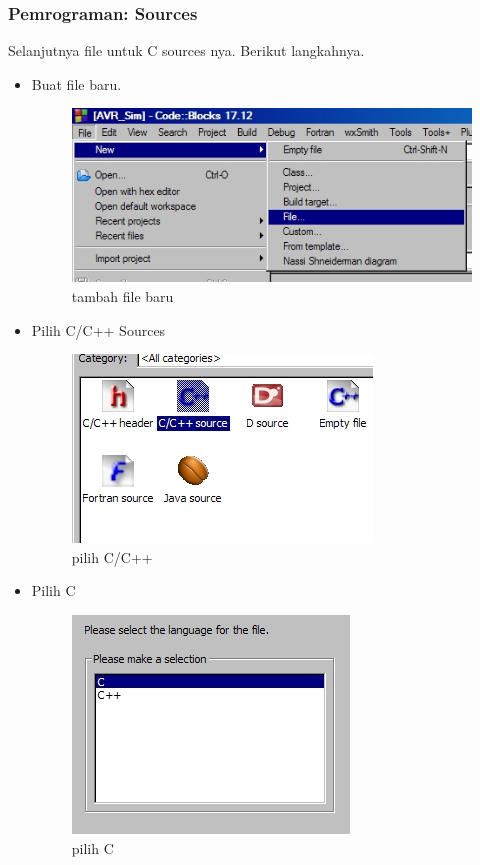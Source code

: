 \documentclass[12pt,]{article}
\begin{document}
	\subsubsection{Pemrograman: Sources}
	
	Selanjutnya file untuk C sources nya.
	Berikut langkahnya.
	\begin{itemize}
		\item Buat file baru.
		\begin{figure}[H]
			\centering
			\includegraphics[width=0.5\linewidth]{images/hello_a9}
			\caption{tambah file baru}
		\end{figure}
	
		\newpage
		\item Pilih C/C++ Sources
		\begin{figure}[H]
			\centering
			\includegraphics[width=0.5\linewidth]{images/hello_a10}
			\caption{pilih C/C++}
		\end{figure}
	
		\item Pilih C
		\begin{figure}[H]
			\centering
			\includegraphics[width=0.5\linewidth]{images/hello_a11}
			\caption{pilih C}
		\end{figure}
	

\end{itemize}
\end{document}
